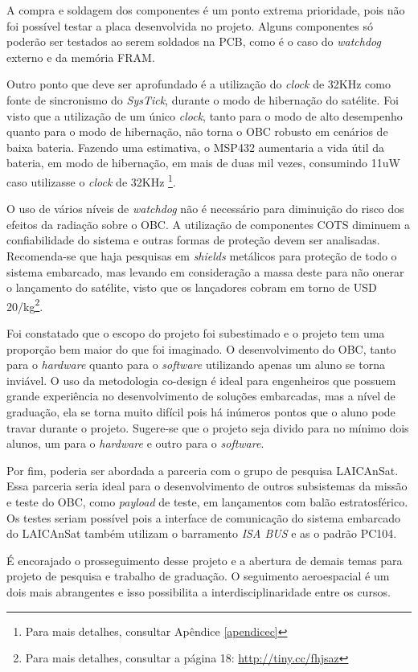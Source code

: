 A compra e soldagem dos componentes é um ponto extrema prioridade, pois não foi possível testar a placa desenvolvida no projeto. Alguns componentes só poderão ser testados ao serem soldados na PCB, como é o caso do \textit{watchdog} externo e da memória FRAM.

Outro ponto que deve ser aprofundado é a utilização do \textit{clock} de 32KHz como fonte de sincronismo do \textit{SysTick}, durante o modo de hibernação do satélite. Foi visto que a utilização de um único  \textit{clock}, tanto para o modo de alto desempenho quanto para o modo de hibernação, não torna o OBC robusto em cenários de baixa bateria. Fazendo uma estimativa, o MSP432 aumentaria a vida útil da bateria, em modo de hibernação, em mais de duas mil vezes, consumindo 11uW caso utilizasse o \textit{clock} de 32KHz \footnote{Para mais detalhes, consultar Apêndice \ref{apendicec}}.

O uso de vários níveis de \textit{watchdog} não é necessário para diminuição do risco dos efeitos da radiação sobre o OBC. A utilização de componentes COTS diminuem a confiabilidade do sistema e outras formas de proteção devem ser analisadas. Recomenda-se que haja pesquisas em \textit{shields} metálicos para proteção de todo o sistema embarcado,  mas levando em consideração a massa  deste para não onerar o lançamento do satélite, visto que os lançadores cobram em torno de USD 20/kg\footnote{Para mais detalhes, consultar a página 18: \url{http://tiny.cc/fhjsaz}}.

Foi constatado que o escopo do projeto foi subestimado e o projeto tem uma proporção bem maior do que foi imaginado. O desenvolvimento do OBC, tanto para o \textit{hardware} quanto para o \textit{software} utilizando apenas um aluno se torna inviável. O uso da metodologia co-design é ideal para engenheiros que possuem grande experiência no desenvolvimento de soluções embarcadas, mas a nível de graduação, ela se torna muito difícil pois há inúmeros pontos que o aluno pode travar durante o projeto. Sugere-se que o projeto seja divido para no mínimo dois alunos, um para o \textit{hardware} e outro para o \textit{software}. 

Por fim, poderia ser abordada a parceria com o grupo de pesquisa LAICAnSat. Essa parceria seria ideal para o desenvolvimento de outros subsistemas da missão e teste do OBC, como \textit{payload} de teste, em lançamentos com balão estratosférico. Os testes seriam possível pois a interface de comunicação do sistema embarcado do LAICAnSat também utilizam o barramento \textit{ISA BUS} e as o padrão PC104. 

É encorajado o prosseguimento desse projeto e a abertura de demais temas para projeto de pesquisa e trabalho de graduação. O seguimento aeroespacial é um dois mais abrangentes e isso possibilita a interdisciplinaridade entre os cursos.
\FloatBarrier